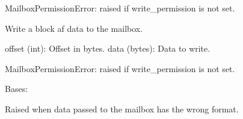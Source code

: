 \documentclass[letterpaper,10pt,english]{sphinxmanual}
\begin{document}
\begin{fulllineitems}
\begin{fulllineitems}
\begin{description}
\sphinxAtStartPar
MailboxPermissionError: raised if write\_permission is not set.

\end{description}

\end{fulllineitems}


\begin{fulllineitems}
\label{\detokenize{aliro_actuator.access_protocol.mailbox:aliro_actuator.access_protocol.mailbox.Mailbox.write}}
\pysigstartsignatures
{}
\pysigstopsignatures
\sphinxAtStartPar
Write a block af data to the mailbox.
\begin{description}
\sphinxAtStartPar
offset (int): Offset in bytes.
data (bytes): Data to write.

\sphinxAtStartPar
MailboxPermissionError: raised if write\_permission is not set.

\end{description}

\end{fulllineitems}


\end{fulllineitems}


\begin{fulllineitems}
\label{\detokenize{aliro_actuator.access_protocol.mailbox:aliro_actuator.access_protocol.mailbox.MailboxFormatError}}
\pysigstartsignatures
{}
\pysigstopsignatures
\sphinxAtStartPar
Bases: {\hyperref[\detokenize{aliro_actuator.access_protocol.errors:aliro_actuator.access_protocol.errors.AccessProtocolError}]{}}

\sphinxAtStartPar
Raised when data passed to the mailbox has the wrong format.

\end{fulllineitems}
\end{document}
